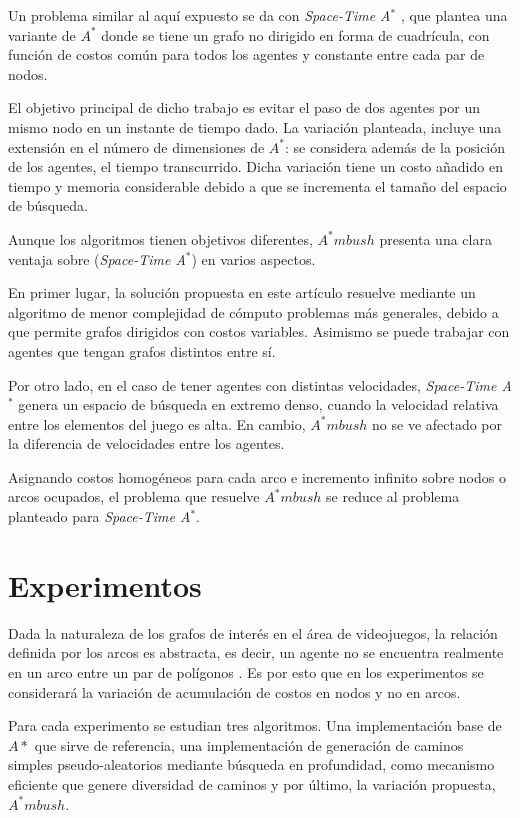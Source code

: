 \documentclass{egpubl}
\begin{document}
Un problema similar al aquí expuesto se da con \textit{Space-Time
 A$^*$} \cite{Sil06}, que plantea una variante de $A^*$ 
donde se tiene un grafo no dirigido en forma de cuadrícula,
 con función de costos común para todos los agentes y 
 constante entre cada par de nodos.

El objetivo principal de dicho trabajo es evitar el paso de
dos agentes por un mismo nodo en un instante de tiempo dado.
La variación planteada, incluye una extensión en el número
de dimensiones de $A^*$: se considera además de la posición
de los agentes, el tiempo transcurrido. Dicha variación tiene
un costo añadido en tiempo y memoria considerable debido a que
se incrementa el tamaño del espacio de búsqueda.

Aunque los algoritmos tienen objetivos diferentes, $A^*mbush$
presenta una clara ventaja sobre (\textit{Space-Time
 A$^*$}) en varios aspectos. 

En primer lugar, la solución propuesta en este artículo resuelve 
mediante un algoritmo de menor complejidad de cómputo
problemas más generales, debido a que permite grafos dirigidos
con costos variables. Asimismo se puede trabajar con agentes que
tengan grafos distintos entre sí.

Por otro lado, en el caso de tener agentes con distintas velocidades,
\textit{Space-Time A$^*$} genera un espacio de búsqueda en extremo
denso, cuando la velocidad relativa entre los e\-le\-men\-tos del juego es
alta. En cambio, $A^*mbush$ no se ve afectado por la diferencia de 
velocidades entre los agentes.

Asignando costos homogéneos para cada arco e incremento infinito
sobre nodos o arcos ocupados, el problema que resuelve $A^*mbush$
se reduce al problema planteado para \textit{Space-Time
A$^*$}.

\section{Experimentos}

Dada la naturaleza de los grafos de interés en el área de
videojuegos, la relación definida por los arcos es abstracta,
es decir, un agente no se encuentra realmente en un arco
entre un par de polígonos \cite{MF09}. Es por esto que en los
experimentos se considerará la variación de acumulación de
costos en nodos y no en arcos.

Para cada experimento se estudian tres algoritmos.
Una implementación base de $A*$ que sirve de referencia,
una implementación de generación de caminos simples pseudo-aleatorios
mediante búsqueda en profundidad, como me\-ca\-nis\-mo eficiente
que genere diversidad de caminos y por último, la variación
propuesta, $A^*mbush$.
\end{document}
